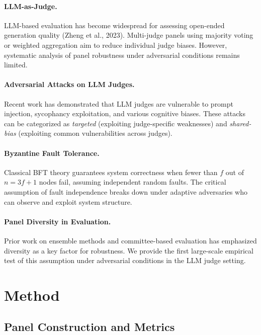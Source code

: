 \documentclass[11pt,a4paper]{article}
\begin{document}
\paragraph{LLM-as-Judge.}
LLM-based evaluation has become widespread for assessing open-ended generation quality (Zheng et al., 2023).
Multi-judge panels using majority voting or weighted aggregation aim to reduce individual judge biases.
However, systematic analysis of panel robustness under adversarial conditions remains limited.

\paragraph{Adversarial Attacks on LLM Judges.}
Recent work has demonstrated that LLM judges are vulnerable to prompt injection, sycophancy exploitation, and various cognitive biases.
These attacks can be categorized as \emph{targeted} (exploiting judge-specific weaknesses) and \emph{shared-bias} (exploiting common vulnerabilities across judges).

\paragraph{Byzantine Fault Tolerance.}
Classical BFT theory guarantees system correctness when fewer than $f$ out of $n=3f+1$ nodes fail, assuming independent random faults.
The critical assumption of fault independence breaks down under adaptive adversaries who can observe and exploit system structure.

\paragraph{Panel Diversity in Evaluation.}
Prior work on ensemble methods and committee-based evaluation has emphasized diversity as a key factor for robustness.
We provide the first large-scale empirical test of this assumption under adversarial conditions in the LLM judge setting.

\section{Method}
\label{sec:method}

\subsection{Panel Construction and Metrics}
\end{document}
